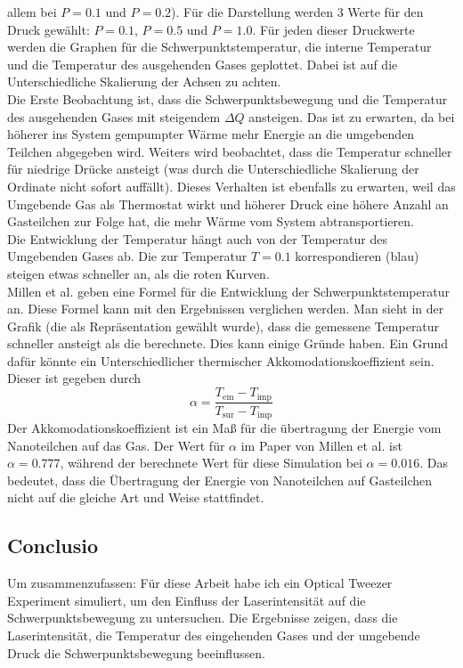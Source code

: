 \documentclass[12pt]{article}
\begin{document}
allem bei $P=0.1$ und $P=0.2$). Für die Darstellung werden 3 Werte für den Druck gewählt: $P=0.1$, $P=0.5$ und $P=1.0$. Für jeden 
dieser Druckwerte werden die Graphen für die Schwerpunktstemperatur, die interne Temperatur und die Temperatur des ausgehenden Gases 
geplottet. Dabei ist auf die Unterschiedliche Skalierung der Achsen zu achten.\\
Die Erste Beobachtung ist, dass die Schwerpunktsbewegung und die Temperatur des ausgehenden Gases mit steigendem $\Delta Q$ ansteigen.
Das ist zu erwarten, da bei höherer ins System gempumpter Wärme mehr Energie an die umgebenden Teilchen abgegeben wird. Weiters wird 
beobachtet, dass die Temperatur schneller für niedrige Drücke ansteigt (was durch die Unterschiedliche Skalierung der 
Ordinate nicht sofort auffällt). Dieses Verhalten ist ebenfalls zu erwarten, weil das Umgebende Gas als Thermostat wirkt und 
höherer Druck eine höhere Anzahl an Gasteilchen zur Folge hat, die mehr Wärme vom System abtransportieren.\\
Die Entwicklung der Temperatur hängt auch von der Temperatur des Umgebenden Gases ab. Die zur Temperatur $T=0.1$ korrespondieren (blau) 
steigen etwas schneller an, als die roten Kurven.\\
Millen et al. geben eine Formel für die Entwicklung der Schwerpunktstemperatur an. Diese Formel kann mit den Ergebnissen verglichen werden. 
Man sieht in der Grafik (die als Repräsentation gewählt wurde), 
dass die gemessene Temperatur schneller ansteigt als die berechnete. Dies kann einige Gründe haben. Ein Grund dafür könnte
ein Unterschiedlicher thermischer Akkomodationskoeffizient sein. Dieser ist gegeben durch
\begin{equation}
    \alpha = \frac{T_\text{em} - T_\text{imp}}{T_\text{sur} - T_\text{imp}}
\end{equation}
Der Akkomodationskoeffizient ist ein Maß für die übertragung der Energie vom Nanoteilchen auf das Gas. Der Wert für $\alpha$ im Paper von 
Millen et al. ist $\alpha = 0.777$, während der berechnete Wert für diese Simulation bei $\alpha = 0.016$. Das bedeutet, dass 
die Übertragung der Energie von Nanoteilchen auf Gasteilchen nicht auf die gleiche Art und Weise stattfindet. 



\subsection{Conclusio}
Um zusammenzufassen: Für diese Arbeit habe ich ein Optical Tweezer Experiment simuliert, um den Einfluss der Laserintensität 
auf die Schwerpunktsbewegung zu untersuchen. Die Ergebnisse zeigen, dass die Laserintensität, die Temperatur
des eingehenden Gases und der umgebende Druck die Schwerpunktsbewegung beeinflussen. 
\end{document}
